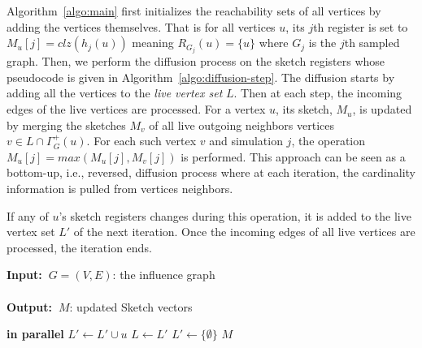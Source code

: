 \documentclass[final,5p,times,twocolumn]{elsarticle}
\renewcommand{\algorithmicrequire}{\textbf{Input:~}}
\renewcommand{\algorithmicensure}{\textbf{Output:~}}
\newcommand\acro{{\sc{HyperFuseR\xspace}\xspace}\xspace}
\newcommand\kktodo[1]{\textcolor{red}{#1}}
\begin{document}
 Algorithm~\ref{algo:main} first initializes the reachability sets of all vertices by adding the vertices themselves. 
 That is for all vertices $u$, its $j$th register is set to $M_u[j]=clz(h_j(u))$ meaning $R_{{G}_j}(u) = \{u\}$ where $G_j$ is the $j$th sampled graph. 
 Then, we perform the diffusion process on the sketch registers whose pseudocode is given in Algorithm~\ref{algo:diffusion-step}. The diffusion starts by adding all the vertices to the {\em live vertex set} $L$. 
 Then at each step, the incoming edges of the live vertices are processed. 
 For a vertex $u$, its sketch, $M_u$, is updated by merging the sketches $M_v$ of all live outgoing neighbors vertices $v \in {L} \cap \Gamma^+_{G}(u)$. For each such vertex $v$ and simulation $j$, the operation $M_u[j] = max(M_u[j], M_v[j])$ is performed. This approach can be seen as a bottom-up, i.e., reversed,  diffusion process where at each iteration, the cardinality information is pulled from vertices neighbors.


If any of $u$'s sketch registers changes during this operation, it is added to the live vertex set $L'$ of the next iteration. Once the incoming edges of all live vertices are processed, the iteration ends. 
 
 
\renewcommand{\baselinestretch}{0.95}
\begin{algorithm}[!ht]
\caption{($G,M,{\cal J},R_S$)}
\label{algo:diffusion-step}
\algorithmicrequire{$G = (V,E)$: the influence graph
\\
\\}
\algorithmicensure{$M$: updated Sketch vectors
}
\begin{algorithmic}[1]
         {\bf in parallel} \label{ln:inner_start} %
            \For{$j \in (0,{\cal J}]$} \label{ln:vec1}
                 \label{ln:early_exit}
                    \label{ln:update}          
                \EndIf
            \EndFor
                \State $L' \leftarrow L' \cup u $ \label{ln:inner_end}
            \EndIf
        \EndFor
        \EndFor
        \State $L \leftarrow L'$
        \State $L' \leftarrow \{\emptyset\}$
    \EndWhile
    \State \Return $M$
\end{algorithmic}
\end{algorithm}
\renewcommand{\baselinestretch}{1}
\end{document}
